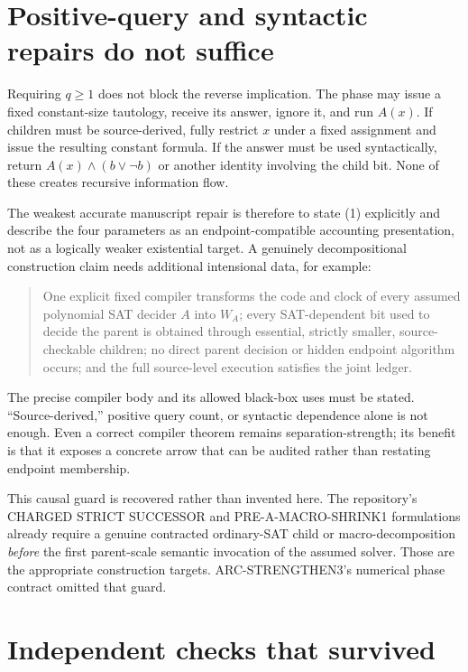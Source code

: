 \documentclass[11pt]{article}
\begin{document}
\section{Positive-query and syntactic repairs do not suffice}

Requiring $q\ge1$ does not block the reverse implication.  The phase may
issue a fixed constant-size tautology, receive its answer, ignore it, and run
$A(x)$.  If children must be source-derived, fully restrict $x$ under a fixed
assignment and issue the resulting constant formula.  If the answer must be
used syntactically, return
$A(x)\wedge(b\vee\neg b)$ or another identity involving the child bit.
None of these creates recursive information flow.

The weakest accurate manuscript repair is therefore to state (1) explicitly
and describe the four parameters as an endpoint-compatible accounting
presentation, not as a logically weaker existential target.  A genuinely
decompositional construction claim needs additional intensional data, for
example:
\begin{quote}
One explicit fixed compiler transforms the code and clock of every assumed
polynomial SAT decider $A$ into $W_A$; every SAT-dependent bit used to decide
the parent is obtained through essential, strictly smaller, source-checkable
children; no direct parent decision or hidden endpoint algorithm occurs; and
the full source-level execution satisfies the joint ledger.
\end{quote}
The precise compiler body and its allowed black-box uses must be stated.
``Source-derived,'' positive query count, or syntactic dependence alone is
not enough.  Even a correct compiler theorem remains separation-strength;
its benefit is that it exposes a concrete arrow that can be audited rather
than restating endpoint membership.

This causal guard is recovered rather than invented here.  The repository's
CHARGED STRICT SUCCESSOR and PRE-A-MACRO-SHRINK1 formulations already require
a genuine contracted ordinary-SAT child or macro-decomposition \emph{before}
the first parent-scale semantic invocation of the assumed solver.  Those are
the appropriate construction targets.  ARC-STRENGTHEN3's numerical phase
contract omitted that guard.

\section{Independent checks that survived}
\end{document}
